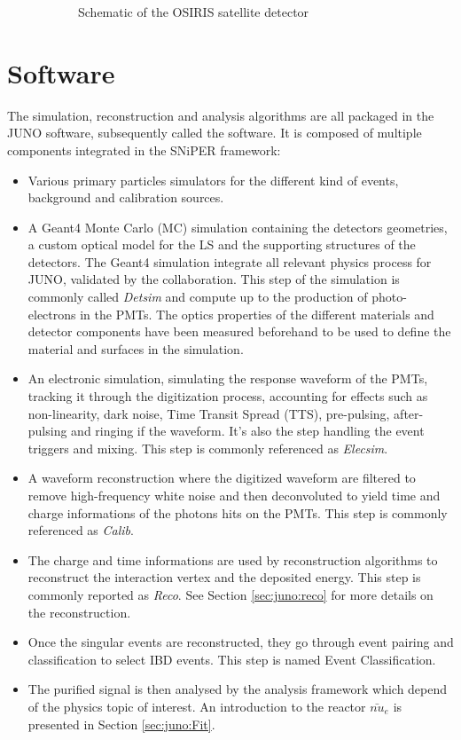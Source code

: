 \documentclass[../main.tex]{subfiles}
\begin{document}
\begin{figure}[ht]
\begin{subfigure}[t]{0.49\linewidth}
    \caption{Schematic of the OSIRIS satellite detector}
    \label{fig:juno:osiris}
  \end{subfigure}
  \caption{}
\end{figure}

\section{Software}
\label{sec:juno:software}

The simulation, reconstruction and analysis algorithms are all packaged in the JUNO software, subsequently called the software.
It is composed of multiple components integrated in the SNiPER \cite{lin_application_2017} framework:

\begin{itemize}
  \item Various primary particles simulators for the different kind of events, background and calibration sources.
  \item A Geant4 \cite{agostinelli_geant4simulation_2003, allison_geant4_2006, allison_recent_2016} Monte Carlo (MC) simulation containing the detectors geometries, a custom optical model for the LS and the supporting structures of the detectors. The Geant4 simulation integrate all relevant physics process for JUNO, validated by the collaboration. This step of the simulation is commonly called \textit{Detsim} and compute up to the production of photo-electrons in the PMTs. The optics properties of the different materials and detector components have been measured beforehand to be used to define the material and surfaces in the simulation.
  \item An electronic simulation, simulating the response waveform of the PMTs, tracking it through the digitization process, accounting for effects such as non-linearity, dark noise, Time Transit Spread (TTS), pre-pulsing, after-pulsing and ringing if the waveform. It's also the step handling the event triggers and mixing. This step is commonly referenced as \textit{Elecsim}.
  \item A waveform reconstruction where the digitized waveform are filtered to remove high-frequency white noise and then deconvoluted to yield time and charge informations of the photons hits on the PMTs. This step is commonly referenced as \textit{Calib}.
  \item The charge and time informations are used by reconstruction algorithms to reconstruct the interaction vertex and the deposited energy. This step is commonly reported as \textit{Reco}. See Section \ref{sec:juno:reco} for more details on the reconstruction.
  \item Once the singular events are reconstructed, they go through event pairing and classification to select IBD events. This step is named Event Classification.
  \item The purified signal is then analysed by the analysis framework which depend of the physics topic of interest. An introduction to the reactor $\bar{nu}_e$ is presented in Section \ref{sec:juno:Fit}.
\end{itemize}
\end{document}
